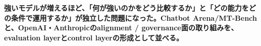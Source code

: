 \noindent\textbf{強いモデルが増えるほど、「何が強いのかをどう比較するか」と「どの能力をどの条件で運用するか」が独立した問題になった。Chatbot Arena/MT-Benchと、OpenAI・Anthropicのalignment / governance面の取り組みを、evaluation layerとcontrol layerの形成として並べる。}\autocite{src-14f8acc117f1,src-1df7a91d31ec,src-25adcaa1c831,src-394ea6d17701,src-8f63dfa1697f,src-a1c8df89a3c9,src-b276b4af9d56,src-b2d10cbd609c,src-b6a5fdb87e9f}
